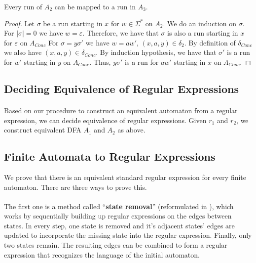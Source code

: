 \begin{lemma}
    \label{dfa_conc_cont}
    Every run of $A_2$ can be mapped to a run in $A_3$.
\end{lemma}
\begin{proof}
    Let $\sigma$ be a run starting in $x$ for $w \in \Sigma^*$ on $A_2$.
    We do an induction on $\sigma$.
    For $|\sigma| = 0$%
    we have $w = \varepsilon$.
    Therefore, we have that $\sigma$ is also a run starting in $x$ for $\varepsilon$ on $A_{Conc}$
    For $\sigma = y\sigma'$ we have $w = aw'$, $(x, a, y) \in \delta_2$.
    By definition of $\delta_{Conc}$ we also have $(x, a, y) \in \delta_{Conc}$.
    By induction hypothesis, we have that $\sigma'$ is a run for $w'$ starting in $y$ on $A_{Conc}$.
    Thus, $y\sigma'$ is a run for $aw'$ starting in $x$ on $A_{Conc}$.
\end{proof}


\subsection{Deciding Equivalence of Regular Expressions}

\paragraph{} 
Based on our procedure to construct an equivalent automaton from a regular expression, we can decide equivalence of regular expressions. Given $r_1$ and $r_2$, we construct equivalent DFA $A_1$ and $A_2$ as above.


\subsection{Finite Automata to Regular Expressions}
We prove that there is an equivalent standard regular expression for every finite automaton.
There are three ways to prove this. 

\paragraph{}
The first one is a method called ``\textbf{state removal}'' \cite{SignalFlow} (reformulated in \cite{springerlink:10.1007/978-3-540-30500-2}),
which works by sequentially building up regular expressions on the edges between states. 
In every step, one state is removed and it's adjacent states' edges are updated to incorporate the missing state into the regular expression.
Finally, only two states remain. The resulting edges can be combined to form a regular expression that recognizes the language of the initial automaton.

